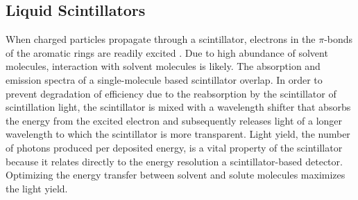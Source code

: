 \documentclass{JINST}
\begin{document}


\subsection{Liquid Scintillators}
When charged particles propagate through a scintillator, electrons in the $\pi$-bonds of the aromatic rings are readily excited \cite{birks64}. Due to high abundance of solvent molecules, interaction with solvent molecules is likely. The absorption and emission spectra of a single-molecule based scintillator overlap. In order to prevent degradation of efficiency due to the reabsorption by the scintillator of scintillation light, the scintillator is mixed with a wavelength shifter that absorbs the energy from the excited electron and subsequently releases light of a longer wavelength to which the scintillator is more transparent. Light yield, the number of photons produced per deposited energy, is a vital property of the scintillator because it relates directly to the energy resolution a scintillator-based detector. Optimizing the energy transfer between solvent and solute molecules maximizes the light yield.
\end{document}
